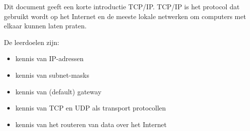 Dit document geeft een korte introductie TCP/IP. TCP/IP is het protocol dat gebruikt wordt op het Internet en de meeste lokale netwerken om computers met elkaar kunnen laten praten.

De leerdoelen zijn:
\begin{itemize}
\item kennis van IP-adressen
\item kennis van subnet-masks
\item kennis van (default) gateway
\item kennis van TCP en UDP als transport protocollen
\item kennis van het routeren van data over het Internet
\end{itemize}

